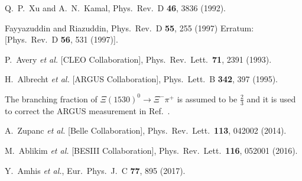 \begin{thebibliography}{99}
 Q.~P.~Xu and A.~N.~Kamal,
  Phys.\ Rev.\ D {\bf 46}, 3836 (1992).

  Fayyazuddin and Riazuddin,
  Phys.\ Rev.\ D {\bf 55}, 255 (1997) Erratum: [Phys.\ Rev.\ D {\bf 56}, 531 (1997)].


  P.~Avery {\it et al.} [CLEO Collaboration],
  Phys.\ Rev.\ Lett.\  {\bf 71}, 2391 (1993).

  H.~Albrecht {\it et al.} [ARGUS Collaboration],
  Phys.\ Lett.\ B {\bf 342}, 397 (1995).

The branching fraction of $\Xi(1530)^0\to\Xi^{-}\pi^{+}$ is assumed to be $\frac{2}{3}$ and it is used to correct the ARGUS measurement in Ref.~\cite{Albrecht:1994hr}.


		A.~Zupanc {\it et al.}  [Belle Collaboration],
Phys.\ Rev.\ Lett.\  {\bf 113}, 042002 (2014).

M.~Ablikim {\it et al.} [BESIII Collaboration],
  Phys.\ Rev.\ Lett.\  {\bf 116}, 052001 (2016).

  
  Y.~Amhis {\it et al.},
  Eur.\ Phys.\ J.\ C {\bf 77}, 895 (2017).
  

\end{thebibliography}
